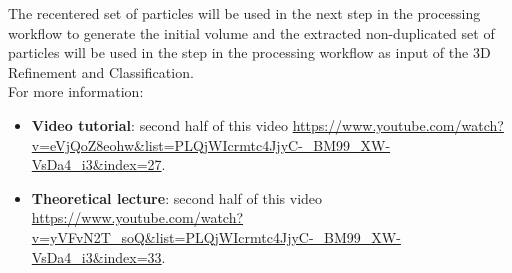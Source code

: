 The recentered set of particles will be used in the next step in the processing workflow to generate the initial volume and the extracted non-duplicated set of particles will be used in the step in the processing workflow as input of the 3D Refinement and Classification. \\ 

  For more information: 
\begin{itemize}
   \item \textbf{Video tutorial}:  second half of this video \url{https://www.youtube.com/watch?v=eVjQoZ8eohw&list=PLQjWIcrmtc4JjyC-_BM99_XW-VsDa4_i3&index=27}.
   \item \textbf{Theoretical lecture}: second half of this video \url{https://www.youtube.com/watch?v=yVFvN2T_soQ&list=PLQjWIcrmtc4JjyC-_BM99_XW-VsDa4_i3&index=33}.
  \end{itemize}
